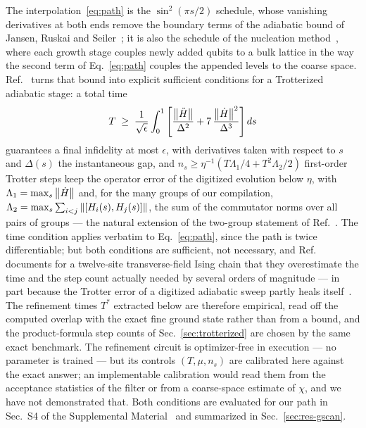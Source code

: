 \documentclass[
  aps,            %
  prc,            %
  reprint,        %
  superscriptaddress,
  floatfix,
  nofootinbib
]{revtex4-2}
\newcommand{\SM}{Supplemental Material~\cite{SM}}
\begin{document}
The interpolation~\eqref{eq:path} is the $\sin^2(\pi s/2)$ schedule, whose
vanishing derivatives at both ends remove the boundary terms of the adiabatic
bound of Jansen, Ruskai and Seiler~\cite{Jansen2007}; it is also the schedule
of the nucleation method~\cite{Sadia2026}, where each growth stage couples
newly added qubits to a bulk lattice in the way the second term of
Eq.~\eqref{eq:path} couples the appended levels to the coarse space.
Ref.~\cite{Sadia2026} turns that bound into explicit sufficient conditions
for a Trotterized adiabatic stage: a total time
\begin{equation}
  T\;\ge\;\frac{1}{\sqrt{\epsilon}}\int_0^1
  \left[\frac{\norm{\ddot H}}{\Delta^2}+7\,\frac{\norm{\dot H}^2}{\Delta^3}\right]ds
  \label{eq:Tbound}
\end{equation}
guarantees a final infidelity at most $\epsilon$, with derivatives taken with
respect to $s$ and $\Delta(s)$ the instantaneous gap, and
$n_s\ge\eta^{-1}(T\Lambda_1/4+T^2\Lambda_2/2)$ first-order Trotter steps keep
the operator error of the digitized evolution below $\eta$, with
$\Lambda_1=\max_s\norm{\dot H}$ and, for the many groups of our compilation,
$\Lambda_2=\max_s\sum_{i<j}\norm{[H_i(s),H_j(s)]}$, the sum of the
commutator norms over all pairs of groups --- the natural extension of the
two-group statement of Ref.~\cite{Sadia2026}.  The time condition applies verbatim to
Eq.~\eqref{eq:path}, since the path is twice differentiable; but both
conditions are sufficient, not necessary, and
Ref.~\cite{Sadia2026} documents for a twelve-site transverse-field Ising
chain that they overestimate the time and the step count actually needed by
several orders of magnitude --- in part because the Trotter error of a
digitized adiabatic sweep partly heals itself~\cite{Kovalsky2023}.  The
refinement times $T^{*}$ extracted below are therefore empirical, read off
the computed overlap with the exact fine ground state rather than from a
bound, and the product-formula step counts of Sec.~\ref{sec:trotterized} are
chosen by the same exact benchmark.  The refinement circuit is optimizer-free
in execution --- no parameter is trained --- but its controls $(T,\mu,n_s)$
are calibrated here against the exact answer; an implementable calibration
would read them from the acceptance statistics of the filter or from a
coarse-space estimate of $\chi$, and we have not demonstrated that.
Both conditions are evaluated for our path in Sec.~S4 of the \SM{} and
summarized in Sec.~\ref{sec:res-gscan}.
\end{document}

